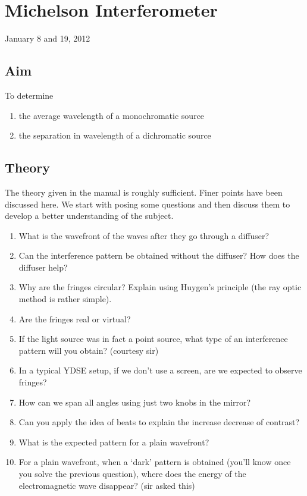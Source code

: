 \chapter{Michelson Interferometer}
\begin{flushright}
January 8 and 19, 2012 \\
\end{flushright}

\section{Aim}
	To determine
	\begin{enumerate}
		\item the average wavelength of a monochromatic source
		\item the separation in wavelength of a dichromatic source
	\end{enumerate}

\section{Theory}
	The theory given in the manual is roughly sufficient. Finer points have been discussed here. We start with posing some questions and then discuss them to develop a better understanding of the subject.
	\begin{enumerate}
		\item What is the wavefront of the waves after they go through a diffuser?
		\item Can the interference pattern be obtained without the diffuser? How does the diffuser help?		
		\item Why are the fringes circular? Explain using Huygen's principle (the ray optic method is rather simple).
		\item Are the fringes real or virtual?
		\item If the light source was in fact a point source, what type of an interference pattern will you obtain? (courtesy sir)
		\item In a typical YDSE setup, if we don't use a screen, are we expected to observe fringes?
		\item How can we span all angles using just two knobs in the mirror?
		\item Can you apply the idea of beats to explain the increase decrease of contrast?
		\item What is the expected pattern for a plain wavefront?
		\item For a plain wavefront, when a `dark' pattern is obtained (you'll know once you solve the previous question), where does the energy of the electromagnetic wave disappear? (sir asked this)
	\end{enumerate}
	

